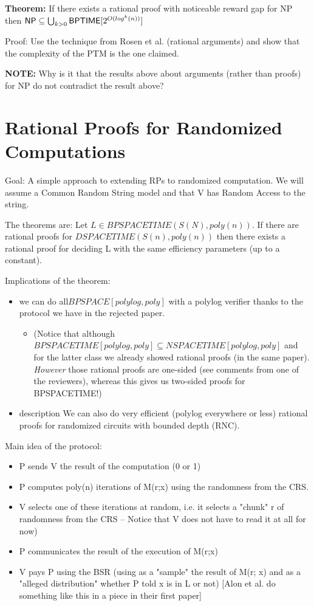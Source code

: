 \textbf{Theorem: } If there exists a rational proof with noticeable reward gap for NP then ${\mathsf{NP}} \subseteq \bigcup_{k>0}{\mathsf{BPTIME}}[2^{O(log^k(n))} ]$ 

Proof: Use the technique from Rosen et al. (rational arguments) and show that the complexity of the PTM is the one claimed.

\textbf{NOTE: } Why is it that the results above about arguments (rather than proofs) for NP do not contradict the result above?

\section{Rational Proofs for Randomized Computations}

Goal: A simple approach to extending RPs to randomized computation. We will assume a Common Random String model and that V has Random Access to the string.

The theorems are:
Let $L \in BPSPACETIME(S(N), poly(n))$. If there are rational proofs for $DSPACETIME(S(n), poly(n))$ then there exists a rational proof for deciding L with the same efficiency parameters (up to a constant).

Implications of the theorem:
\begin{itemize}
\item we can do all$ BPSPACE[polylog, poly]$ with a polylog verifier thanks to the protocol we have in the rejected paper. 
\begin{itemize}
	\item (Notice that although $BPSPACETIME[polylog, poly] \subseteq NSPACETIME[polylog, poly]$ and for the latter class we already showed rational proofs (in the same paper). \textit{However} those rational proofs are one-sided (see comments from one of the reviewers), whereas this gives us two-sided proofs for BPSPACETIME!)
\end{itemize}
\item description We can also do very efficient (polylog everywhere or less) rational proofs for randomized circuits with bounded depth  (RNC).
\end{itemize}

Main idea of the protocol: 
\begin{itemize}
\item P sends V the result of the computation (0 or 1)
\item P computes poly(n) iterations of M(r;x) using the randomness from the CRS.
\item V selects one of these iterations at random, i.e. it selects a "chunk" r of randomness from the CRS -- Notice that V does not have to read it at all for now)
\item P communicates the result of the execution of M(r;x)
\item V pays P using the BSR (using as a "sample" the result of M(r; x) and as a "alleged distribution" whether P told x is in L or not) [Alon et al. do something like this in a piece in their first paper]
\end{itemize}

